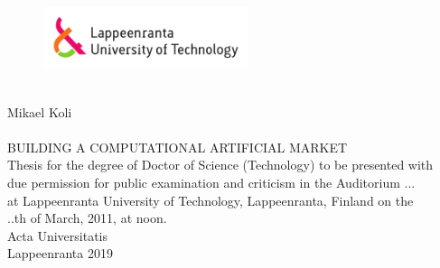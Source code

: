 
\thispagestyle{empty} \setlength{\parindent}{0pt}
\begin{figure}
\includegraphics[width=60mm]{./figs/Merkki_Logo_CMYK}\\
\end{figure}
~\\

\vspace{60mm}
{\sffamily\large Mikael Koli\\
\\
\MakeUppercase{\Large Building a Computational Artificial Market}}\\

{\sffamily\footnotesize Thesis for the degree of Doctor of Science (Technology) to be presented with\\
due permission for public examination and criticism in the Auditorium ...\\
at Lappeenranta University of Technology, Lappeenranta, Finland on the\\
..th of March, 2011, at noon.}\\

{\sffamily\normalsize Acta Universitatis\\
Lappeenranta 2019}
